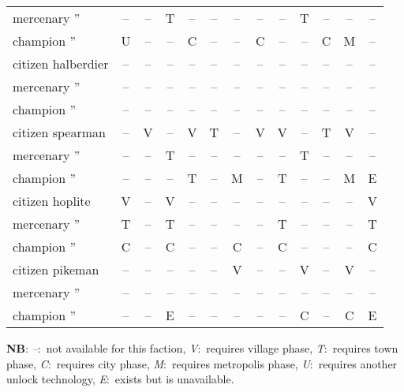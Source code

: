 \documentclass{article}
\newcommand{\legenda}{
\textbf{NB}:
\emph{--}:~not available for this faction, 
\emph{V}:~requires village phase, 
\emph{T}:~requires town phase, 
\emph{C}:~requires city phase, 
\emph{M}:~requires metropolis phase, 
\emph{U}:~requires another unlock technology, 
\emph{E}:~exists but is unavailable.
}
\begin{document}
\begin{tabular}{l|cccc|cccc|cccc}
mercenary ''                          & -- & -- & T  & -- & -- & -- & -- & -- & T  & -- & -- & -- \\
champion  ''                          & U  & -- & -- & C  & -- & -- & C  & -- & -- & C  & M  & -- \\
\hline
citizen halberdier                    & -- & -- & -- & -- & -- & -- & -- & -- & -- & -- & -- & -- \\
mercenary ''                          & -- & -- & -- & -- & -- & -- & -- & -- & -- & -- & -- & -- \\
champion  ''                          & -- & -- & -- & -- & -- & -- & -- & -- & -- & -- & -- & -- \\
\hline
citizen spearman                      & -- & V  & -- & V  & T  & -- & V  & V  & -- & T  & V  & -- \\
mercenary ''                          & -- & -- & T  & -- & -- & -- & -- & -- & T  & -- & -- & -- \\
champion  ''                          & -- & -- & -- & T  & -- & M  & -- & T  & -- & -- & M  & E  \\
\hline
citizen hoplite                       & V  & -- & V  & -- & -- & -- & -- & -- & -- & -- & -- & V  \\
mercenary ''                          & T  & -- & T  & -- & -- & -- & -- & T  & -- & -- & -- & T  \\
champion  ''                          & C  & -- & C  & -- & -- & C  & -- & C  & -- & -- & -- & C  \\
\hline
citizen pikeman                       & -- & -- & -- & -- & -- & V  & -- & -- & V  & -- & V  & -- \\
mercenary ''                          & -- & -- & -- & -- & -- & -- & -- & -- & -- & -- & -- & -- \\
champion  ''                          & -- & -- & E  & -- & -- & -- & -- & -- & C  & -- & C  & E  \\
\end{tabular}

\legenda


\clearpage
\end{document}
